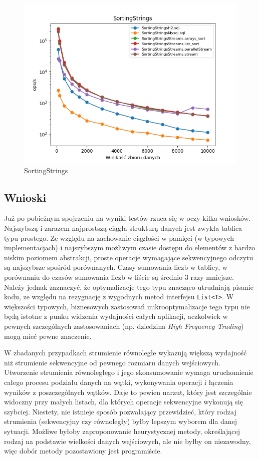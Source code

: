 \documentclass[12pt]{extarticle}
\begin{document}
\begin{figure}[H]
\centering
\includegraphics[width=15cm]{plots/SortingStrings}
\caption{SortingStrings}
\end{figure}

\newpage

\subsection{Wnioski}

    Już po pobieżnym spojrzeniu na wyniki testów rzuca się w oczy kilka wniosków. Najszybszą i zarazem najprostszą ciągła strukturą danych jest zwykła tablica typu prostego. Ze względu na zachowanie ciągłości w pamięci (w typowych implementacjach) i najszybszym możliwym czasie dostępu do elementów z bardzo niskim poziomem abstrakcji, proste operacje wymagające sekwencyjnego odczytu są najszybsze spośród porównanych. Czasy sumowania liczb w tablicy, w porównaniu do czasów sumowania liczb w liście są średnio 3 razy mniejsze. Należy jednak zaznaczyć, że optymalizacje tego typu znacząco utrudniają pisanie kodu, ze względu na rezygnację z wygodnych metod interfejsu \texttt{List<T>}. W większości typowych, biznesowych zastosowań mikrooptymalizacje tego typu nie będą istotne z punku widzenia wydajności całych aplikacji, aczkolwiek w pewnych szczególnych zastosowaniach (np. dziedzina \textit{High Frequency Trading}) mogą mieć pewne znaczenie.

    W zbadanych przypadkach strumienie równoległe wykazują większą wydajność niż strumienie sekwencyjne od pewnego rozmiaru danych wejściowych. Utworzenie strumienia równoległego i jego skonsumowanie wymaga uruchomienie całego procesu podziału danych na wątki, wykonywania operacji i łączenia wyników z poszczególnych wątków. Daje to pewien narzut, który jest szczególnie widoczny przy małych listach, dla których operacje sekwencyjne wykonują się szybciej. Niestety, nie istnieje sposób pozwalający przewidzieć, który rodzaj strumienia (sekwencyjny czy równoległy) byłby lepszym wyborem dla danej sytuacji. Możliwe byłoby zaproponowanie heurystycznej metody, określającej rodzaj na podstawie wielkości danych wejściowych, ale nie byłby on niezawodny, więc dobór metody pozostawiony jest programiście.
\end{document}
